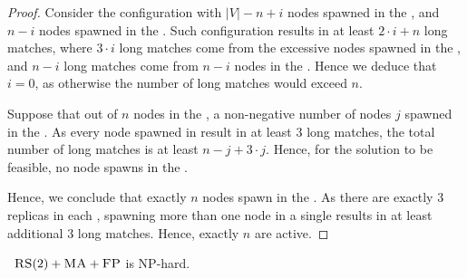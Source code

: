\begin{proof}
Consider the configuration with $|V|-n+i$ nodes spawned in the \CoverSubtree{}, and $n-i$ nodes spawned in the \MatchSubtree{}.
Such configuration results in at least $2\cdot i + n$ long matches, where $3\cdot i$ long matches come from the excessive nodes spawned in the \CoverSubtree{}, and $n-i$ long matches come from $n-i$ nodes in the \MatchSubtree{}.
Hence we deduce that $i = 0$, as otherwise the number of long matches would exceed $n$.

Suppose that out of $n$ nodes in the \MatchSubtree{}, a non-negative number of nodes $j$ spawned in the \UnqGadgets{}.
As every node spawned in \UnqGadget{} result in at least $3$ long matches, the total number of long matches is at least $n-j + 3\cdot j$.
Hence, for the solution to be feasible, no node spawns in the \UnqGadget{}.

Hence, we conclude that exactly $n$ nodes spawn in the \TripleGadgets{}.
As there are exactly $3$ replicas in each \TripleGadget{}, spawning more than one node in a single \TripleGadget{} results in at least additional $3$ long matches.
Hence, exactly $n$ \TripleGadgets{} are active.
\end{proof}

\begin{theorem}
  ~$\textsc{RS}(2)+\textsc{MA}+\textsc{FP}$ is NP-hard.
  \label{th:ma-reduction}
\end{theorem}

